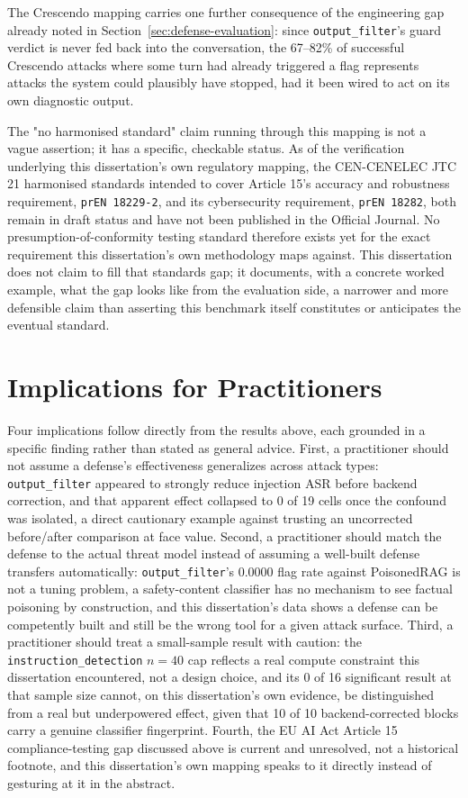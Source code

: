 The Crescendo mapping carries one further consequence of the engineering
gap already noted in Section~\ref{sec:defense-evaluation}: since
\texttt{output\_filter}'s guard verdict is never fed
back into the conversation, the 67--82\% of successful Crescendo attacks
where some turn had already triggered a flag represents attacks the
system could plausibly have stopped, had it been wired to act on its own
diagnostic output.

The "no harmonised standard" claim running through this mapping is not
a vague assertion; it has a specific, checkable status. As of the
verification underlying this dissertation's own regulatory mapping, the
CEN-CENELEC JTC 21 harmonised standards intended to cover Article 15's
accuracy and robustness requirement, \texttt{prEN 18229-2}, and its
cybersecurity requirement, \texttt{prEN 18282}, both remain in draft
status and have not been published in the Official Journal. No
presumption-of-conformity testing standard therefore exists yet for the
exact requirement this dissertation's own methodology maps against.
This dissertation does not claim to fill that standards gap; it
documents, with a concrete worked example, what the gap looks like from
the evaluation side, a narrower and more defensible claim than asserting
this benchmark itself constitutes or anticipates the eventual standard.

\section{Implications for Practitioners}

Four implications follow directly from the results above, each grounded
in a specific finding rather than stated as general advice. First, a
practitioner should not assume a defense's effectiveness generalizes
across attack types: \texttt{output\_filter} appeared to strongly reduce
injection ASR before backend correction, and that apparent effect
collapsed to 0 of 19 cells once the confound was isolated, a direct
cautionary example against trusting an uncorrected before/after
comparison at face value. Second, a practitioner should match the
defense to the actual threat model instead of assuming a well-built
defense transfers automatically: \texttt{output\_filter}'s 0.0000 flag
rate against PoisonedRAG is not a tuning problem, a safety-content
classifier has no mechanism to see factual poisoning by construction,
and this dissertation's data shows a defense can be competently built
and still be the wrong tool for a given attack surface. Third, a
practitioner should treat a small-sample result with caution: the
\texttt{instruction\_detection} $n=40$ cap reflects a real compute
constraint this dissertation encountered, not a design choice, and its
0 of 16 significant result at that sample size cannot, on this
dissertation's own evidence, be distinguished from a real but
underpowered effect, given that 10 of 10 backend-corrected blocks carry
a genuine classifier fingerprint. Fourth, the EU AI Act Article 15
compliance-testing gap discussed above is current and unresolved, not a
historical footnote, and this dissertation's own mapping speaks to it
directly instead of gesturing at it in the abstract.

